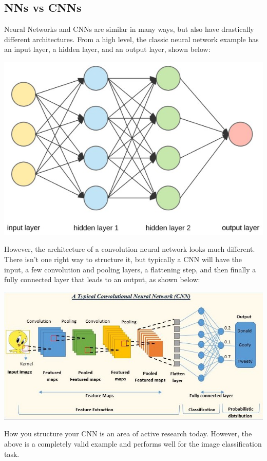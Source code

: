 \documentclass{article}
\begin{document}
    \subsection{NNs vs CNNs}
        Neural Networks and CNNs are similar in many ways, but also have drastically different architectures. From a high level, the classic neural network example has an input layer, a hidden layer, and an output layer, shown below:
        \begin{center}
            \includegraphics[scale=0.6]{images/NN.jpg}    
        \end{center}

        However, the architecture of a convolution neural network looks much different. There isn't one right way to structure it, but typically a CNN will have the input, a few convolution and pooling layers, a flattening step, and then finally a fully connected layer that leads to an output, as shown below:
        \begin{center}
            \includegraphics[scale=0.6]{images/CNN.jpg}
        \end{center}
        How you structure your CNN is an area of active research today. However, the above is a completely valid example and performs well for the image classification task.
\end{document}
